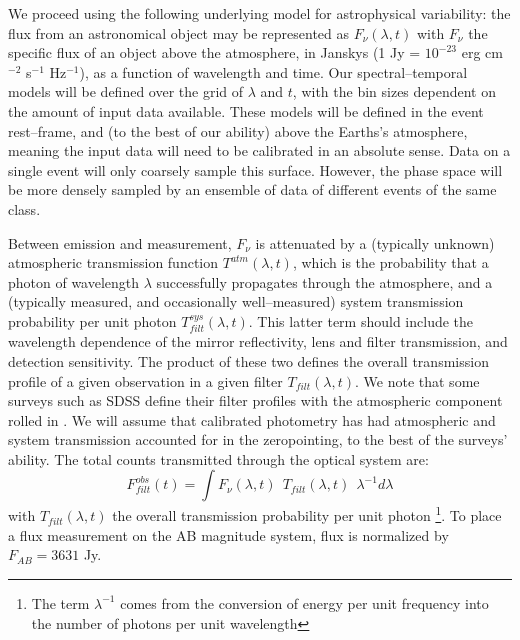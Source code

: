 We proceed using the following underlying model for astrophysical variability:
the flux from an astronomical object may be represented as $F_\nu(\lambda, t)$
with $F_\nu$ the specific flux of an object above the atmosphere, in Janskys (1
Jy = $10^{-23}$ erg cm$^{-2}$ s$^{-1}$ Hz$^{-1}$), as a function of wavelength
and time.  Our spectral--temporal models will be defined over the grid of
$\lambda$ and $t$, with the bin sizes dependent on the amount of input data
available.  These models will be defined in the event rest--frame, and (to the
best of our ability) above the Earths's atmosphere, meaning the input data will
need to be calibrated in an absolute sense. Data on a single event will only
coarsely sample this surface.  However, the phase space will be more densely
sampled by an ensemble of data of different events of the same class.

Between emission and measurement, $F_\nu$ is attenuated by a (typically unknown)
atmospheric transmission function $T^{atm}(\lambda, t)$, which is the
probability that a photon of wavelength $\lambda$ successfully propagates
through the atmosphere, and a (typically measured, and occasionally
well--measured) system transmission probability per unit photon
$T^{sys}_{filt}(\lambda, t)$.  This latter term should include the wavelength
dependence of the mirror reflectivity, lens and filter transmission, and
detection sensitivity.  The product of these two defines the overall
transmission profile of a given observation in a given filter $T_{filt}(\lambda,
t)$.  We note that some surveys such as SDSS define their filter profiles with
the atmospheric component rolled in \citep{2007AJ....134..973I}.  We will assume
that calibrated photometry has had atmospheric and system transmission accounted
for in the zeropointing, to the best of the surveys' ability.  The total counts
transmitted through the optical system are: $$F^{obs}_{filt} (t) = \int
F_\nu(\lambda, t) ~~ T_{filt} (\lambda, t) ~~ \lambda^{-1} d\lambda$$ with
$T_{filt}(\lambda, t)$  the overall transmission probability per unit photon
\footnote{The term $\lambda^{-1}$ comes from the conversion of energy per unit
frequency into the number of photons per unit wavelength}. To place a flux
measurement on the AB magnitude system, flux is normalized by $F_{AB} = 3631$
Jy.


